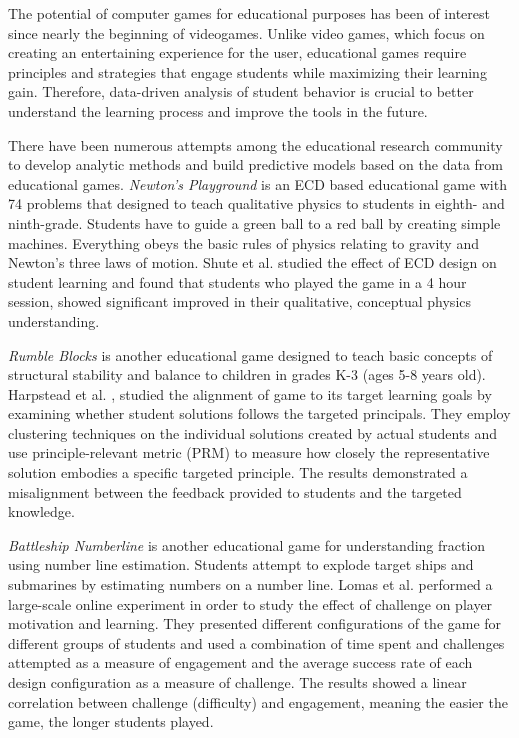 \documentclass{sigchi}
\begin{document}
The potential of computer games for educational purposes has been of interest since nearly the beginning of videogames. Unlike video games, which focus on creating an entertaining experience for the user, educational games require principles and strategies that engage students while maximizing their learning gain. Therefore, data-driven analysis of student behavior is crucial to better understand the learning process and improve the tools in the future.

There have been numerous attempts among the educational research community to develop analytic methods and build predictive models based on the data from educational games. \textit{Newton's Playground} is an ECD based educational game with 74 problems that designed to teach qualitative physics to students in eighth- and ninth-grade. Students have to guide a green ball to a red ball by creating simple machines. 
Everything obeys the basic rules of physics relating to gravity and Newton’s three laws of motion. 
Shute et al. \cite{shute2013stealth} studied the effect of ECD design on student learning and found that students who played the game in a 4 hour session, showed significant improved in their qualitative, conceptual physics understanding.

\textit {Rumble Blocks}  is another educational game designed to teach basic concepts of structural stability and balance to children in grades K-3 (ages 5-8 years old). Harpstead et al. \cite{harpstead2014using}, studied the alignment of game to its target learning goals by examining whether student solutions follows the targeted principals. They employ clustering techniques on the individual solutions created by actual students and use principle-relevant metric (PRM) to measure how closely the representative solution embodies a specific targeted principle. The results demonstrated a misalignment between the feedback provided to students and the targeted knowledge.

\textit {Battleship Numberline} is another educational game for understanding fraction using number line estimation. Students attempt to explode target ships and submarines by estimating numbers on a number line. Lomas et al. \cite{lomas2013optimizing} performed a large-scale online experiment in order to study the effect of challenge on player motivation and learning. They presented different configurations of the game for different groups of students and used a combination of time spent and challenges attempted as a measure of engagement and the average success rate of each design configuration as a measure of challenge. The results showed a linear correlation between challenge (difficulty) and engagement, meaning the easier the game, the longer students played.
\end{document}
